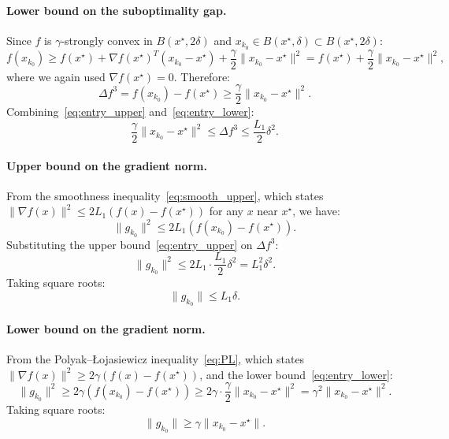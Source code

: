 \documentclass{article}
\begin{document}
\paragraph{Lower bound on the suboptimality gap.} Since $f$ is $\gamma$-strongly convex in $B(x^\star, 2\delta)$ and $x_{k_0} \in B(x^\star, \delta) \subset B(x^\star, 2\delta)$:
\[
f(x_{k_0}) \geq f(x^\star) + \nabla f(x^\star)^T(x_{k_0} - x^\star) + \frac{\gamma}{2}\|x_{k_0} - x^\star\|^2 = f(x^\star) + \frac{\gamma}{2}\|x_{k_0} - x^\star\|^2,
\]
where we again used $\nabla f(x^\star) = 0$. Therefore:
\begin{equation}
\label{eq:entry_lower}
\Delta f^3 = f(x_{k_0}) - f(x^\star) \geq \frac{\gamma}{2}\|x_{k_0} - x^\star\|^2.
\end{equation}
Combining~\eqref{eq:entry_upper} and~\eqref{eq:entry_lower}:
\begin{equation}
\label{eq:entry_gap}
\frac{\gamma}{2}\|x_{k_0} - x^\star\|^2 \leq \Delta f^3 \leq \frac{L_1}{2}\delta^2.
\end{equation}

\paragraph{Upper bound on the gradient norm.} From the smoothness inequality~\eqref{eq:smooth_upper}, which states $\|\nabla f(x)\|^2 \leq 2L_1(f(x) - f(x^\star))$ 
for any $x$ near $x^\star$, we have:
\[
\|g_{k_0}\|^2 \leq 2L_1(f(x_{k_0}) - f(x^\star)).
\]
Substituting the upper bound~\eqref{eq:entry_upper} on $\Delta f^3$:
\[
\|g_{k_0}\|^2 \leq 2L_1 \cdot \frac{L_1}{2}\delta^2 = L_1^2\delta^2.
\]
Taking square roots:
\begin{equation}
\label{eq:entry_grad_upper}
\|g_{k_0}\| \leq L_1\delta.
\end{equation}

\paragraph{Lower bound on the gradient norm.} From the Polyak--\L{}ojasiewicz inequality~\eqref{eq:PL}, which states \\
 $\|\nabla f(x)\|^2 \geq 2\gamma(f(x) - f(x^\star))$, 
and the lower bound~\eqref{eq:entry_lower}:
\[
\|g_{k_0}\|^2 \geq 2\gamma(f(x_{k_0}) - f(x^\star)) \geq 2\gamma \cdot \frac{\gamma}{2}\|x_{k_0} - x^\star\|^2 = \gamma^2\|x_{k_0} - x^\star\|^2.
\]
Taking square roots:
\begin{equation}
\label{eq:entry_grad_lower}
\|g_{k_0}\| \geq \gamma\|x_{k_0} - x^\star\|.
\end{equation}
\end{document}
